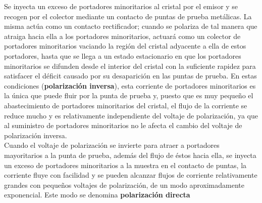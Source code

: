\documentclass[oneside]{book}
\numberwithin{equation}{section}
\numberwithin{figure}{section}
\numberwithin{table}{section}
\begin{document}
				Se inyecta un exceso de portadores minoritarios al cristal por el emisor y se recogen por el colector mediante un contacto de puntas de prueba metálicas. La misma actúa como un contacto rectificador; cuando se polariza de tal manera que atraiga hacia ella a los portadores minoritarios, actuará como un colector de portadores minoritarios vaciando la región del cristal adyacente a ella de estos portadores, hasta que se llega a un estado estacionario en que los portadores minoritarios se difunden desde el interior del cristal con la suficiente rapidez para satisfacer el déficit causado por su desaparición en las puntas de prueba. En estas condiciones (\textbf{polarización inversa}), esta corriente de portadores minoritarios es la única que puede fluir por la punta de prueba y, puesto que es muy pequeño el abastecimiento de portadores minoritarios del cristal, el flujo de la corriente se reduce mucho y es relativamente independiente del voltaje de polarización, ya que al suministro de portadores minoritarios no le afecta el cambio del voltaje de polarización inversa.\\
				
				Cuando el voltaje de polarización se invierte para atraer a portadores mayoritarios a la punta de prueba, además del flujo de éstos hacia ella, se inyecta un exceso de  portadores minoritarios a la muestra en el contacto de puntas, la corriente fluye con facilidad y se pueden alcanzar flujos de corriente relativamente grandes con pequeños voltajes de polarización, de un modo aproximadamente exponencial. Este modo se denomina \textbf{polarización directa}	
							
\end{document}
